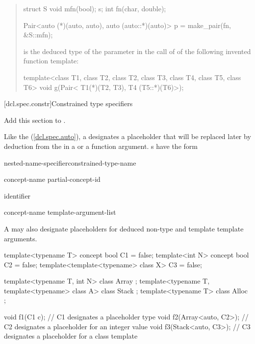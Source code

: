 \begin{quote}
\begin{addedblock}
\begin{codeblock}
struct S { void mfn(bool); } s;
int fn(char, double);

Pair<auto (*)(auto, auto), auto (auto::*)(auto)> p = make_pair(fn, &S::mfn);
\end{codeblock}
is the deduced type of the parameter  in the call of 
 of the following invented function 
template:
\begin{codeblock}
template<class T1, class T2, class T2, class T3, class T4, class T5, class T6> 
  void g(Pair< T1(*)(T2, T3), T4 (T5::*)(T6)>);
\end{codeblock}
\exitexample
\end{addedblock}
\end{quote}


[dcl.spec.constr]{Constrained type specifiers}

Add this section to .

\pnum
Like the  
(\ref{dcl.spec.auto}),
a 
designates a placeholder that will be replaced later by deduction
from the  in a 
 or a
function argument. 
% 
s have
the form
% 
\begin{bnf}
\br
  nested-name-specifier\opt constrained-type-name

\br
  concept-name\br
  partial-concept-id

\br
  identifier

\br
    concept-name \terminal{<} template-argument-list\opt \terminal{>}
\end{bnf}
% 
A 
may also designate placeholders for deduced non-type and template 
template arguments.
\enterexample
\begin{codeblock}
template<typename T> concept bool C1 = false;
template<int N> concept bool C2 = false;
template<template<typename> class X> C3 = false;

template<typename T, int N> class Array { };
template<typename T, template<typename> class A> class Stack { };
template<typename T> class Alloc { };

void f1(C1 c);            // C1 designates a placeholder type
void f2(Array<auto, C2>); // C2 designates a placeholder for an integer value
void f3(Stack<auto, C3>); // C3 designates a placeholder for a class template
\end{codeblock}
\exitexample

